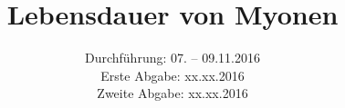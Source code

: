 
\usepackage{showframe}

\subject{Versuch 01}
\title{Lebensdauer von Myonen}
\date{Durchführung: 07. -- 09.11.2016 \\
      Erste Abgabe: xx.xx.2016 \\
      Zweite Abgabe: xx.xx.2016}



\maketitle
\newpage








\printbibliography


